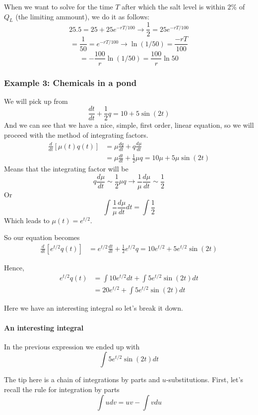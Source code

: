 When we want to solve for the time $T$ after which the salt level is within $2\%$ of $Q_L$ (the limiting ammount),
we do it as follows:
$$
25.5 = 25 + 25 e^{-rT/100} \rightarrow \frac{1}{2} = 25 e^{-rT/100}
$$
$$
= \frac{1}{50} = e^{-rT/100} \rightarrow \ln (1/50) = \frac{-rT}{100}
$$
$$
= - \frac{100}{r} \ln(1/50) = \frac{100}{r} \ln{50}
$$


\subsubsection{Example 3: Chemicals in a pond}

We will pick up from
$$
\frac{dt}{dt} + \frac{1}{2}q = 10 + 5\sin(2t)
$$
And we can see that we have a nice, simple, first order, linear equation, so we will proceed with
the method of integrating factors.
\begin{align*}
\frac{d}{dt} \left[ \mu(t) q(t) \right] &= \mu \frac{dq}{dt} + q\frac{d\mu}{dt} \\
&= \mu\frac{dt}{dt} + \frac{1}{2}\mu q = 10\mu + 5\mu\sin(2t)
\end{align*}
Means that the integrating factor will be
$$
q\frac{d\mu}{dt} \sim \frac{1}{2}\mu q \rightarrow
\frac{1}{\mu}\frac{d\mu}{dt} \sim \frac{1}{2}
$$
Or
$$
\int \frac{1}{\mu}\frac{d\mu}{dt} dt = \int \frac{1}{2}
$$
Which leads to $\mu(t) = e^{t/2}$.

So our equation becomes
\begin{align*}
\frac{d}{dt} \left[ e^{t/2} q(t) \right] &= e^{t/2} \frac{dt}{dt} + \frac{1}{2} e^{t/2} q = 10 e^{t/2} + 5 e^{t/2} \sin(2t)
\end{align*}

Hence,
\begin{align*}
e^{t/2} q(t) &= \int 10 e^{t/2} dt + \int 5 e^{t/2} \sin(2t) dt \\
&= 20 e^{t/2} + \int 5 e^{t/2} \sin(2t) dt
\end{align*}

Here we have an interesting integral so let's break it down.

\paragraph{An interesting integral}

In the previous expression we ended up with
$$
\int 5 e^{t/2} \sin(2t) dt
$$

The tip here is a chain of integrations by parts and $u$-substitutions.
First, let's recall the rule for integration by parts
$$
\int u dv = uv - \int v du
$$

